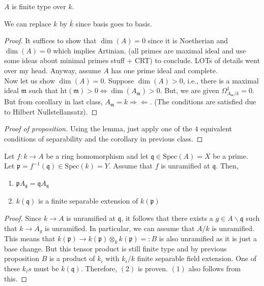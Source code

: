 \documentclass[oneside, 12pt]{scrbook}
\newcommand{\spec}{\mathrm{Spec}}
\newcommand{\pr}{\mathfrak{p}}
\newcommand{\m}{\mathfrak{m}}
\newcommand{\bs}{\backslash}
\theoremstyle{theorem}
\begin{document}
\begin{lemma}
$A$ is finite type over $k$. 
\end{lemma}

\begin{remark}
We can replace $k$ by $\bar{k}$ since basis goes to basis.
\end{remark}

\begin{proof}
It suffices to show that $\dim(A)=0$ since it is Noetherian and $\dim (A)=0$ which implies Artinian. (all primes are maximal ideal and use some ideas about minimal primes stuff + CRT) to conclude. LOTs of details went over my head. Anyway, assume $A$ has one prime ideal and complete.\\

Now let us show $\dim (A)=0$. Suppose $\dim (A) > 0$, i.e., there is a maximal ideal $\m$ such that $\mathrm{ht}(\m) >0 \Leftrightarrow \dim(A_{\m})>0$. But, we are given $\Omega_{A_{\m}/k}^{1}=0$. But from corollary in last class, $A_{\m}=k \Rightarrow \Leftarrow$. (The conditions are satisfied due to Hilbert Nullstellansatz).
\end{proof}

\begin{proof}[Proof of proposition]
Using the lemma, just apply one of the $4$ equivalent conditions of separability and the corollary in previous class.
\end{proof}

\begin{lemma}
Let $f: k \rightarrow A$ be a ring homomorphism and let $\mathfrak{q}\in \spec(A)=X$ be a prime. Let $\pr = f^{-1}(\mathfrak{q})\in \spec(k)=Y$. Assume that $f$ is unramified at $\mathfrak{q}$. Then, 
\begin{enumerate}
\item $\pr A_{\mathfrak{q}} = \mathfrak{q}A_{\mathfrak{q}}$
\item $k(\mathfrak{q})$ is a finite separable extension of $k(\pr)$
\end{enumerate} 
\end{lemma}

\begin{proof}
Since $k \rightarrow A$ is unramified at $\mathfrak{q}$, it follows that there exists a $g \in A\bs \mathfrak{q}$ such that $k \rightarrow A_{g}$ is unramified. In particular, we can assume that $A/k$ is unramified. This means that $k(\pr) \rightarrow k(\pr) \otimes_{k} k(\pr)=:B$ is also unramified as it is just a base change. But this tensor product is still finite type and by previous proposition $B$ is a product of $k_{i}$ with $k_{i}/k$ finite separable field extension. One of these $k_{i}s$ must be $k(\mathfrak{q})$. Therefore, $(2)$ is proven. $(1)$ also follows from this. 
\end{proof}
\end{document}

